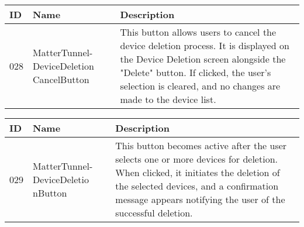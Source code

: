 \documentclass[conference]{IEEEtran}
\begin{document}
\begin{enumerate}[itemsep=2ex, parsep=1ex]
\begin{enumerate}[itemsep=2ex, parsep=1ex]
	      	      \begin{table}[h!]
	      	      	\def\arraystretch{1.24} \small
	      	      	\begin{tabular}{|p{1.2cm}|p{2.5cm}|p{4.0cm}|}
	      	      		\hline
	      	      		ID  & Name                                     & Description                                                                                                                                                                                                                             \\
	      	      		\hline
	      	      		028 & MatterTunnel-DeviceDeletion CancelButton & This button allows users to cancel the device deletion process. It is displayed on the Device Deletion screen alongside the "Delete" button. If clicked, the user’s selection is cleared, and no changes are made to the device list. \\
	      	      		\hline
	      	      	\end{tabular}
	      	      \end{table}
	      	      
	      	      \begin{table}[h!]
	      	      	\def\arraystretch{1.24} \small
	      	      	\begin{tabular}{|p{1.2cm}|p{2.5cm}|p{4.0cm}|}
	      	      		\hline
	      	      		ID  & Name                               & Description                                                                                                                                                                                                                            \\
	      	      		\hline
	      	      		029 & MatterTunnel-DeviceDeletio nButton & This button becomes active after the user selects one or more devices for deletion. When clicked, it initiates the deletion of the selected devices, and a confirmation message appears notifying the user of the successful deletion. \\
	      	      		\hline
	      	      	\end{tabular}
	      	      \end{table}
	      	      
	      	      \vspace{10cm}
	      	      

\end{enumerate}
\end{enumerate}
\end{document}

